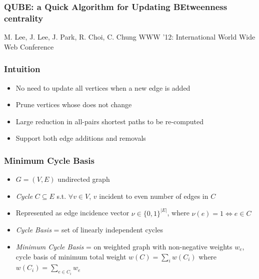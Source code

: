 \begin{frame}
  \frametitle{QUBE: a Quick Algorithm for Updating BEtweenness centrality}
  \centering
  \vfill
  {\huge M. Lee, J. Lee, J. Park, R. Choi, C. Chung}
  \vfill
  {\large WWW '12: International World Wide Web Conference}
\end{frame}

\begin{frame}
  \frametitle{Intuition}
  
  \begin{itemize}
    \item No need to update all vertices when a new edge is added
    \item Prune vertices whose \betw does not change
    \item Large reduction in all-pairs shortest paths to be re-computed
    \item Support both edge additions and removals
  \end{itemize}
\end{frame}


\begin{frame}
  \frametitle{Minimum Cycle Basis}
  
  \begin{itemize}
    \item $G=(V,E)$ undirected graph
    \item \emph{Cycle} $C \subseteq E$ s.t. $\forall v \in V$, $v$ incident to even number of edges in $C$
    \item Represented as edge incidence vector $\nu \in \{ 0,1 \}^{|E|}$, where $\nu(e) = 1 \iff e \in C$ 
    \item \emph{Cycle Basis} = set of linearly independent cycles
    \item \emph{Minimum Cycle Basis} = on weighted graph with non-negative weights $w_e$, cycle basis of minimum total weight $w(C) = \sum_{i} w(C_i)$ where $w(C_i) = \sum_{e \in C_i} w_e$
  \end{itemize}  
\end{frame}


